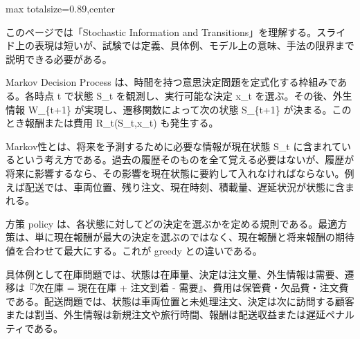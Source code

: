 \begin{minipage}[t]{0.58\textwidth}
\begin{adjustbox}{max totalsize={\textwidth}{0.89\textheight},center}
\begin{minipage}{\textwidth}\scriptsize
{}このページでは「Stochastic Information and Transitions」を理解する。スライド上の表現は短いが、試験では定義、具体例、モデル上の意味、手法の限界まで説明できる必要がある。\par
Markov Decision Process は、時間を持つ意思決定問題を定式化する枠組みである。各時点 t で状態 S\_t を観測し、実行可能な決定 x\_t を選ぶ。その後、外生情報 W\_\{t+1\} が実現し、遷移関数によって次の状態 S\_\{t+1\} が決まる。このとき報酬または費用 R\_t(S\_t,x\_t) も発生する。\par
Markov性とは、将来を予測するために必要な情報が現在状態 S\_t に含まれているという考え方である。過去の履歴そのものを全て覚える必要はないが、履歴が将来に影響するなら、その影響を現在状態に要約して入れなければならない。例えば配送では、車両位置、残り注文、現在時刻、積載量、遅延状況が状態に含まれる。\par
方策 policy は、各状態に対してどの決定を選ぶかを定める規則である。最適方策は、単に現在報酬が最大の決定を選ぶのではなく、現在報酬と将来報酬の期待値を合わせて最大にする。これが greedy との違いである。\par
具体例として在庫問題では、状態は在庫量、決定は注文量、外生情報は需要、遷移は『次在庫 = 現在在庫 + 注文到着 - 需要』、費用は保管費・欠品費・注文費である。配送問題では、状態は車両位置と未処理注文、決定は次に訪問する顧客または割当、外生情報は新規注文や旅行時間、報酬は配送収益または遅延ペナルティである。\par

\end{minipage}
\end{adjustbox}
\end{minipage}
